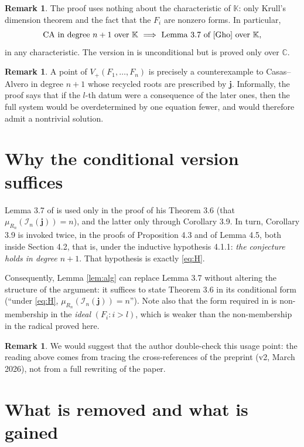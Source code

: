 \documentclass[11pt,reqno]{amsart}
\theoremstyle{plain}
\theoremstyle{definition}
\newtheorem{remark}[theorem]{Remark}
\newcommand{\KK}{\mathbb{K}}
\newcommand{\bj}{\mathbf{j}}
\begin{document}
\begin{remark}
The proof uses nothing about the characteristic of $\KK$: only Krull's dimension
theorem and the fact that the $F_i$ are nonzero forms. In particular,
\[
  \text{CA in degree } n+1 \text{ over } \KK
  \ \Longrightarrow\
  \text{Lemma 3.7 of \cite{Gho} over } \KK,
\]
in any characteristic. The version in \cite{Gho} is unconditional but is proved
only over $\mathbb{C}$.
\end{remark}

\begin{remark}
A point of $V_+(F_1,\dots,F_n)$ is precisely a counterexample to Casas--Alvero in
degree $n+1$ whose recycled roots are prescribed by $\bj$. Informally, the proof
says that if the $l$-th datum were a consequence of the later ones, then the full
system would be overdetermined by one equation fewer, and would therefore admit a
nontrivial solution.
\end{remark}

\section{Why the conditional version suffices}

Lemma 3.7 of \cite{Gho} is used only in the proof of his Theorem 3.6 (that
$\mu_{R_n}(\mathcal I_n(\bj))=n$), and the latter only through Corollary 3.9. In
turn, Corollary 3.9 is invoked twice, in the proofs of Proposition 4.3 and of
Lemma 4.5, both inside Section 4.2, that is, under the inductive hypothesis
4.1.1: \emph{the conjecture holds in degree $n+1$}. That hypothesis is exactly
\eqref{eq:H}.

Consequently, Lemma \ref{lem:alg} can replace Lemma 3.7 without altering the
structure of the argument: it suffices to state Theorem 3.6 in its conditional
form (``under \eqref{eq:H}, $\mu_{R_n}(\mathcal I_n(\bj))=n$''). Note also that
the form required in \cite[(3.9)]{Gho} is non-membership in the \emph{ideal}
$(F_i: i>l)$, which is weaker than the non-membership in the radical proved
here.

\begin{remark}
We would suggest that the author double-check this usage point: the reading above
comes from tracing the cross-references of the preprint (v2, March 2026), not
from a full rewriting of the paper.
\end{remark}

\section{What is removed and what is gained}
\end{document}
